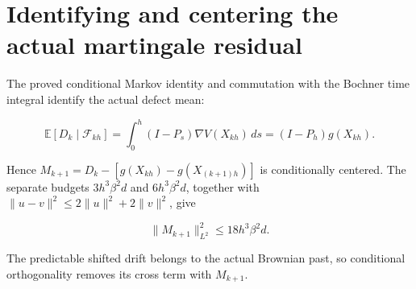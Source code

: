 \documentclass[11pt,a4paper]{article}
\begin{document}
\section{\texorpdfstring{Identifying and centering the actual martingale residual}{Identifying and centering the actual martingale residual}}


The proved conditional Markov identity and commutation with
    the Bochner time integral identify the actual defect mean:


    \[\mathbb E[D_k\mid\mathcal F_{kh}]
      =\int_0^h(I-P_s)\nabla V(X_{kh})\,ds
      =(I-P_h)g(X_{kh}).\]


Hence
    \(M_{k+1}=D_k-[g(X_{kh})-g(X_{(k+1)h})]\) is conditionally
    centered. The separate budgets \(3h^3\beta^2d\) and
    \(6h^3\beta^2d\), together with
    \(\|u-v\|^2\le2\|u\|^2+2\|v\|^2\), give


    \[\|M_{k+1}\|_{L^2}^2\le18h^3\beta^2d.\]


The predictable shifted drift belongs to the actual Brownian past,
    so conditional orthogonality removes its cross term with \(M_{k+1}\).
\end{document}
